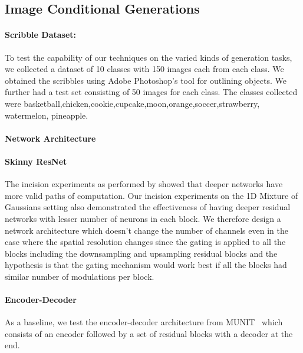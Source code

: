 \subsection{Image Conditional Generations}

\paragraph{Scribble Dataset:}
To test the capability of our techniques on the varied kinds of generation tasks, we collected a dataset of 10 classes with 150 images each from each class. We obtained the scribbles using Adobe Photoshop's tool for outlining objects. We further had a test set consisting of 50 images for each class. The classes collected were basketball,chicken,cookie,cupcake,moon,orange,soccer,strawberry, watermelon, pineapple. 

\paragraph{Network Architecture}

\paragraph{Skinny ResNet}

The incision experiments as performed by \cite{veit2016residual} showed that deeper networks have more  valid paths of computation. Our incision experiments on the 1D Mixture of Gaussians setting also demonstrated the effectiveness of having deeper residual networks with lesser number of neurons in each block. We therefore design a network architecture which doesn't change the number of channels even in the case where the spatial resolution changes since the gating is applied to all the blocks including the downsampling and upsampling residual blocks and the hypothesis is that the gating mechanism would work best if all the blocks had similar number of modulations per block.

\paragraph{Encoder-Decoder} As a baseline, we test the encoder-decoder architecture from MUNIT~\cite{huang2018multimodal} which consists of an encoder followed by a set of residual blocks with a decoder at the end. 

